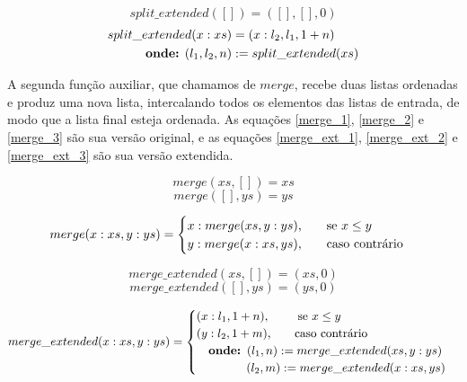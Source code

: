 \documentclass[12pt, oneside, a4paper,english,brazil]{abntex2}
\begin{document}
\newpage

\begin{equation}\label{split_ext_base}
  split\_extended([]) = ([], [], 0)
\end{equation}
\begin{equation}\label{split_ext_ind}
\begin{split}
  split\_extended(x : xs) &= (x : l_{2}, l_{1}, 1 + n)\\
  \text{\textbf{onde:} } (l_{1}, l_{2}, n) &:= split\_extended(xs)
\end{split}
\end{equation}


\qquad A segunda fun\c{c}\~ao auxiliar, que chamamos de $merge$, recebe duas listas
ordenadas e produz uma nova lista, intercalando todos os elementos das listas
de entrada, de modo que a lista final esteja ordenada. As equa\c{c}\~oes \ref{merge_1},
\ref{merge_2} e \ref{merge_3} s\~ao sua vers\~ao original, e as equa\c{c}\~oes
\ref{merge_ext_1}, \ref{merge_ext_2} e \ref{merge_ext_3} s\~ao sua vers\~ao extendida.

\begin{equation} \label{merge_1}
merge(xs, []) = xs
\end{equation}
\begin{equation} \label{merge_2}
merge([], ys) = ys
\end{equation}

\begin{equation} \label{merge_3}
merge(x : xs, y : ys) =
     \begin{cases}
       x : merge(xs, y : ys) \text{,\qquad se $x \le y$} \\
       y : merge(x : xs, ys) \text{,\qquad caso contr\'ario}
     \end{cases}
\end{equation}

\begin{equation} \label{merge_ext_1}
merge\_extended(xs, []) = (xs, 0)
\end{equation}
\begin{equation} \label{merge_ext_2}
merge\_extended([], ys) = (ys, 0)
\end{equation}

\begin{equation} \label{merge_ext_3}
merge\_extended(x : xs, y : ys) =
     \begin{cases}
       (x : l_{1}, 1 + n) \text{,\qquad \, se $x \le y$} \\
       (y : l_{2}, 1 + m) \text{,\qquad caso contr\'ario} \\
       \text{\quad \textbf{onde: }} (l_{1}, n) := merge\_extended(xs, y : ys) \\
       \text{\qquad \quad \,\,\,\,\, } (l_{2}, m) := merge\_extended(x : xs, ys)
     \end{cases}
\end{equation}
\end{document}
